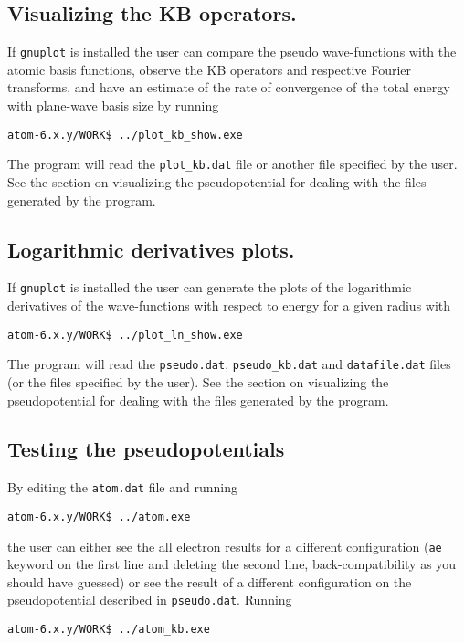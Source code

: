 \documentclass[11pt]{article}
\begin{document}
\subsection{Visualizing the KB operators.}
\label{sec:run-show-KB}

If \texttt{gnuplot} is installed the user can compare the pseudo wave-functions with the atomic basis functions,
observe the KB operators and respective Fourier transforms, and have an estimate of the rate 
of convergence of the total energy with plane-wave basis size by running

\noindent\texttt{atom-6.x.y/WORK\$ ../plot{\_}kb{\_}show.exe}

The program will read the \texttt{plot{\_}kb.dat} file or another file specified by the user.  See the section on
visualizing the pseudopotential for dealing with the files generated by the program.


\subsection{Logarithmic derivatives plots.}
\label{sec:run-show-ln}

If \texttt{gnuplot} is installed the user can generate the plots of the logarithmic derivatives of the
wave-functions with respect to energy for a given radius with

\noindent\texttt{atom-6.x.y/WORK\$ ../plot{\_}ln{\_}show.exe}

The program will read the \texttt{pseudo.dat}, \texttt{pseudo{\_}kb.dat} and \texttt{datafile.dat} files (or the files specified
by the user).   See the section on
visualizing the pseudopotential for dealing with the files generated by the program.


\subsection{Testing the pseudopotentials}
\label{sec:run-test}

By editing the \texttt{atom.dat} file and running

\noindent\texttt{atom-6.x.y/WORK\$ ../atom.exe} 

the user can either see the all electron results for a
different configuration (\texttt{ae} keyword on the first line and deleting the second line, back-compatibility
as you should have guessed) or see the result of a different configuration on the pseudopotential
described in \texttt{pseudo.dat}.  Running

\noindent\texttt{atom-6.x.y/WORK\$ ../atom{\_}kb.exe} 
\end{document}
